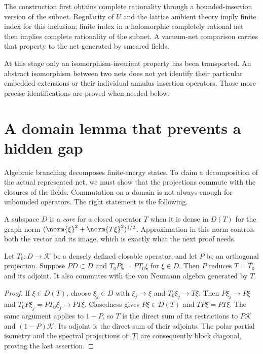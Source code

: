 The construction first obtains complete rationality through a
bounded-insertion version of the subnet. Regularity of $U$ and
the lattice ambient theory imply finite index for this inclusion;
finite index in a holomorphic completely rational net then implies
complete rationality of the subnet. A vacuum-net comparison carries
that property to the net generated by smeared fields.

At this stage only an isomorphism-invariant property has been
transported. An abstract isomorphism between two nets does not yet
identify their particular embedded extensions or their individual
annulus insertion operators. Those more precise identifications
are proved when needed below.

\section{A domain lemma that prevents a hidden gap}

Algebraic branching decomposes finite-energy states. To claim a
decomposition of the actual represented net, we must show that the
projections commute with the closures of the fields. Commutation on
a domain is not always enough for unbounded operators. The right
statement is the following.

A subspace $D$ is a \emph{core} for a closed operator $T$ when
it is dense in $D(T)$ for the graph norm
$(\norm{\xi}^2+\norm{T\xi}^2)^{1/2}$. Approximation in this norm
controls both the vector and its image, which is exactly what
the next proof needs.

\begin{lemma}
\label{lem:unitarity-core}
Let $T_0:D\to\mathcal K$ be a densely defined closable operator,
and let $P$ be an orthogonal projection. Suppose
$PD\subset D$ and $T_0P\xi=PT_0\xi$ for $\xi\in D$.
Then $P$ reduces $T=\overline{T_0}$ and its adjoint. It also
commutes with the von Neumann algebra generated by $T$.
\end{lemma}
\begin{proof}
If $\xi\in D(T)$, choose $\xi_j\in D$ with
$\xi_j\to\xi$ and $T_0\xi_j\to T\xi$. Then
$P\xi_j\to P\xi$ and
$T_0P\xi_j=PT_0\xi_j\to PT\xi$.
Closedness gives $P\xi\in D(T)$ and $TP\xi=PT\xi$.
The same argument applies to $1-P$, so $T$ is the direct sum of
its restrictions to $P\mathcal K$ and $(1-P)\mathcal K$.
Its adjoint is the direct sum of their adjoints. The polar partial
isometry and the spectral projections of $|T|$ are consequently
block diagonal, proving the last assertion.
\end{proof}


